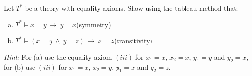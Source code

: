 \begin{problem} 
    
    Let $T^*$ be a theory with equality axioms. Show using the tableau method that:
    \begin{enumerate}[(a)]
        \item $T^*\models x=y\ \to\ y=x$\hfill(symmetry)
        \item $T^*\models (x=y\ \wedge\ y=z)\ \to\ x=z$\hfill(transitivity)
    \end{enumerate}
    {\it Hint:} For (a) use the equality axiom $(iii)$ for $x_1=x$, $x_2=x$, $y_1=y$ and $y_2=x$, \newline
        for (b) use $(iii)$ for $x_1=x$, $x_2=y$, $y_1=x$ and $y_2=z$.
        
\end{problem}

  



